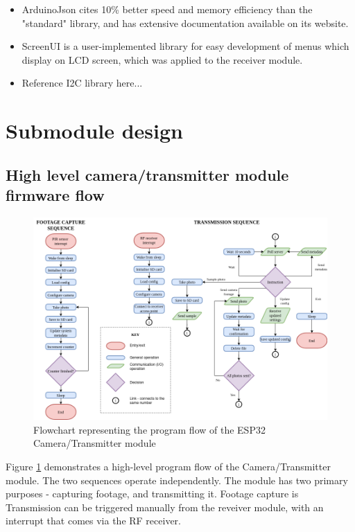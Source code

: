 \begin{itemize}
    \item ArduinoJson cites 10\% better speed and memory efficiency than the "standard" library, and has extensive documentation available on its website.
    \item ScreenUI  is a user-implemented library for easy development of menus which display on LCD screen, which was applied to the receiver module.
    \item Reference I2C library here...
\end{itemize}




\section{Submodule design} \label{s:firmware-design-process}

\subsection{High level camera/transmitter module firmware flow}

\begin{figure}[ht]
    \centering
    \includegraphics[width=\columnwidth]{"Images/ESP-flow.png"}
    \caption{Flowchart representing the program flow of the ESP32 Camera/Transmitter module}
    \label{fig:espflow}
\end{figure}

Figure \ref{fig:espflow} demonstrates a high-level program flow of the Camera/Transmitter module. The two sequences operate independently. The module has two primary purposes - capturing footage, and transmitting it. Footage capture is Transmission can be triggered manually from the reveiver module, with an interrupt that comes via the RF receiver. 

